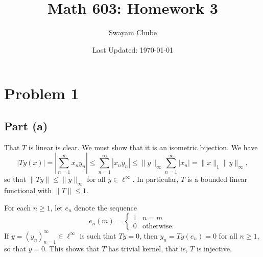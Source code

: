 \documentclass[11pt]{article}
\title{Math 603: Homework 3}
\author{Swayam Chube}
\date{Last Updated: \today}
\theoremstyle{thmstyle}
\theoremstyle{defstyle}
\renewcommand{\le}{\leqslant}
\renewcommand{\ge}{\geqslant}
\begin{document}
\maketitle 

\section{Problem 1}

\subsection{Part (a)}

That $T$ is linear is clear. We must show that it is an isometric bijection. We have 
\begin{equation*}
    |Ty(x)| = \left|\sum_{n = 1}^\infty x_ny_n\right|\le\sum_{n = 1}^\infty |x_ny_n|\le \|y\|_\infty\sum_{n = 1}^\infty |x_n| = \|x\|_1\|y\|_\infty,
\end{equation*}
so that $\|Ty\|\le \|y\|_\infty$ for all $y\in\ell^\infty$. In particular, $T$ is a bounded linear functional with $\|T\|\le 1$.

For each $n\ge 1$, let $e_n$ denote the sequence 
\begin{equation*}
    e_n(m) = \begin{cases}
        1 & n = m\\
        0 & \text{otherwise}.
    \end{cases}
\end{equation*}
If $y = (y_n)_{n = 1}^\infty\in\ell^\infty$ is such that $Ty = 0$, then $y_n = Ty(e_n) = 0$ for all $n\ge 1$, so that $y = 0$. This shows that $T$ has trivial kernel, that is, $T$ is injective.
\end{document}
